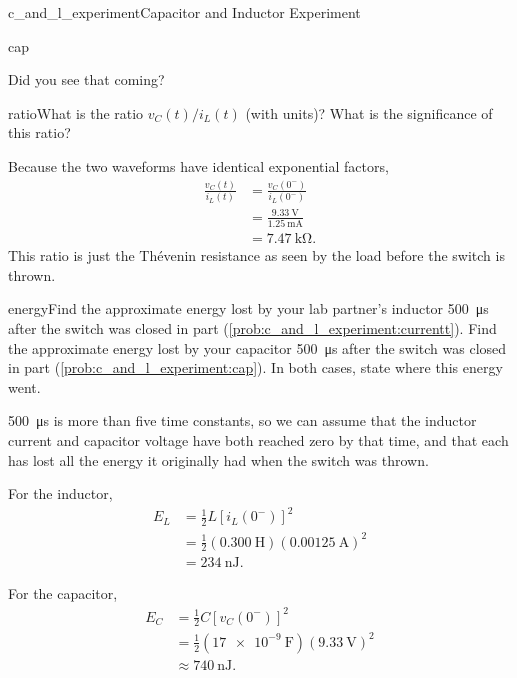 \begin{mainquestion}{c_and_l_experiment}{Capacitor and Inductor Experiment}
\begin{partquestion}{cap}
\begin{answer}
Did you see that coming?
\end{answer}
\end{partquestion}
\begin{partquestion}{ratio}{What is the ratio $v_C(t)/i_L(t)$ (with units)? What is the significance of this ratio? }
\begin{answer}
Because the two waveforms have identical exponential factors,
\begin{align*}
 \frac{v_C(t)}{i_L(t)}
 &= \frac{v_C(0^-)}{i_L(0^-)} \\
 &= \frac{\SI{9.33}{\volt}}{\SI{1.25}{\milli\ampere}} \\
 &= \boxed{\SI{7.47}{\kilo\ohm}}.
\end{align*}
This ratio is just the Th\'evenin resistance as seen by the load before the switch is thrown.
\end{answer}
\end{partquestion}
\begin{partquestion}{energy}{Find the approximate energy lost by your lab partner's inductor \SI{500}{\micro\second} after the switch was closed in part (\cref{prob:c_and_l_experiment:currentt}). Find the approximate energy lost by your capacitor \SI{500}{\micro\second} after the switch was closed in part (\cref{prob:c_and_l_experiment:cap}). In both cases, state where this energy went.}
\begin{answer}
\SI{500}{\micro\second} is more than five time constants, so we can assume that the inductor current and capacitor voltage have both reached zero by that time, and that each has lost all the energy it originally had when the switch was thrown.

For the inductor,
\begin{align*}
 E_L
 &= \frac{1}{2}L\left[i_L(0^-)\right]^2 \\
 &= \frac{1}{2}(\SI{0.300}{\henry})
    (\SI{0.00125}{\ampere})^2 \\
 &= \boxed{\SI{234}{\nano\joule}}.
\end{align*}

For the capacitor,
\begin{align*}
 E_C
 &= \frac{1}{2}C\left[v_C(0^-)\right]^2 \\
 &= \frac{1}{2}(\SI{17e-9}{\farad})(\SI{9.33}{\volt})^2 \\
 &\approx \boxed{\SI{740}{\nano\joule}}.
\end{align*}


\end{answer}
\end{partquestion}
\end{mainquestion}
